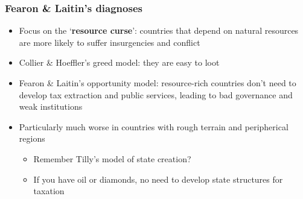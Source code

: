 \documentclass[utf8, xcolor=dvipsnames]{beamer}
\begin{document}
\begin{frame}
\frametitle{Fearon \& Laitin's diagnoses}
\centering

\begin{itemize}[<+->]
  \item Focus on the `\textbf{resource curse}': countries that depend on natural resources are more likely to suffer insurgencies and conflict
  \item Collier \& Hoeffler's greed model: they are easy to loot
  \item Fearon \& Laitin's opportunity model: resource-rich countries don't need to develop tax extraction and public services, leading to bad governance and weak institutions
  \item Particularly much worse in countries with rough terrain and peripherical regions
  \begin{itemize}
    \item Remember Tilly's model of state creation?
    \item If you have oil or diamonds, no need to develop state structures for taxation
  \end{itemize}
\end{itemize}

\end{frame}
\end{document}
